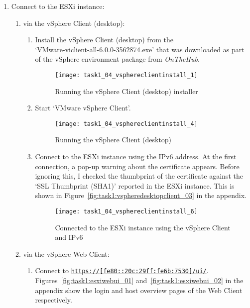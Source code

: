 \begin{enumerate}[resume*=task1methodology]
  \item Connect to the ESXi instance:
    \begin{enumerate}[label=(\alph*)]
      \item via the vSphere Client (desktop):
        \begin{enumerate}[label=\roman*.]
          \item Install the vSphere Client (desktop) from the\\`VMware-viclient-all-6.0.0-3562874.exe' that was downloaded as part of the vSphere environment package from \textit{OnTheHub\textsuperscript{\textregistered}}.
            \begin{figure}[H]
              \centering
              \captionsetup{skip=2pt}
              \texttt{[image: task1\_04\_vsphereclientinstall\_1]}
              \caption{Running the vSphere Client (desktop) installer}
              \label{fig:task1:vspheredesktopclient_01}
            \end{figure}
          \item Start `VMware vSphere Client'.
            \begin{figure}[H]
              \centering
              \captionsetup{skip=2pt}
              \texttt{[image: task1\_04\_vsphereclientinstall\_4]}
              \caption{Running the vSphere Client (desktop)}
              \label{fig:task1:vspheredesktopclient_02}
            \end{figure}
          \item Connect to the ESXi instance using the IPv6 address. At the first connection, a pop-up warning about the certificate appears. Before ignoring this, I checked the thumbprint of the certificate against the `SSL Thumbprint (SHA1)' reported in the ESXi instance. This is shown in Figure~\ref{fig:task1:vspheredesktopclient_03} in the  appendix.
            \begin{figure}[H]
              \centering
              \captionsetup{skip=2pt}
              \texttt{[image: task1\_04\_vsphereclientinstall\_6]}
              \caption{Connected to the ESXi instance using the vSphere Client and IPv6}
              \label{fig:task1:vspheredesktopclient_04}
            \end{figure}
        \end{enumerate}
      \item via the vSphere Web Client:
        \begin{enumerate}[label=\roman*.]
          \item Connect to \texttt{\url{https://[fe80::20c:29ff:fe6b:7530]/ui/}}. Figures~\ref{fig:task1:esxiwebui_01} and~\ref{fig:task1:esxiwebui_02} in the  appendix show the login and host overview pages of the Web Client respectively.
        \end{enumerate}
    \end{enumerate}
\end{enumerate}

